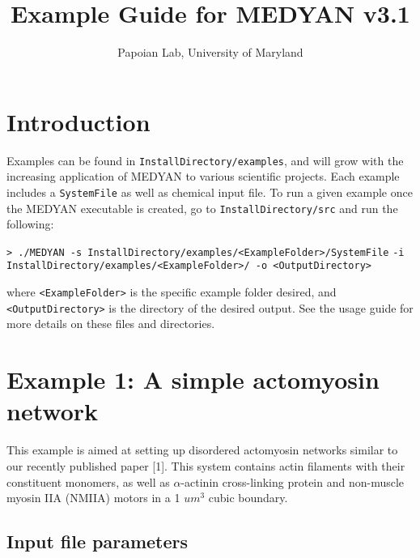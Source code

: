 \documentclass[11pt, oneside]{article}   	%
\title{Example Guide for MEDYAN \textbf{v3.1}}
\author{Papoian Lab, University of Maryland}
\date{}							%
\begin{document}
\maketitle

\tableofcontents
\newpage

\section{Introduction}

Examples can be found in \texttt{InstallDirectory/examples}, and will grow with the increasing application of MEDYAN to various scientific projects. Each example includes a \texttt{SystemFile} as well as chemical input file. To run a given example once the MEDYAN executable is created, go to \texttt{InstallDirectory/src} and run the following:\newline

\indent \texttt{> ./MEDYAN -s InstallDirectory/examples/<ExampleFolder>/SystemFile}\newline
\indent\indent \texttt{-i InstallDirectory/examples/<ExampleFolder>/  -o <OutputDirectory>}\newline

\noindent where \texttt{<ExampleFolder>} is the specific example folder desired, and \texttt{<OutputDirectory>} is the directory of the desired output. See the usage guide for more details on these files and directories.

\section{Example 1: A simple actomyosin network}

This example is aimed at setting up disordered actomyosin networks similar to our recently published paper [1]. This system contains actin filaments with their constituent monomers, as well as $\alpha$-actinin cross-linking protein and non-muscle myosin IIA (NMIIA) motors in a 1 $um^3$ cubic boundary.

\subsection{Input file parameters}
\end{document}
